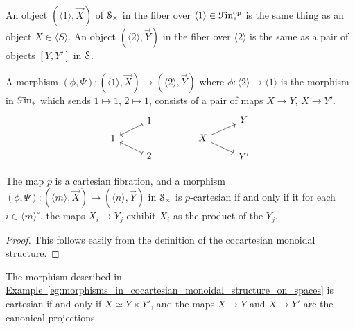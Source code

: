 \documentclass[main.tex]{subfiles}
\begin{document}
\begin{example}
  \label{eg:morphisms_in_cocartesian_monoidal_structure_on_spaces}
  An object $(\langle 1 \rangle, \vec{X})$ of $\S_{\times}$ in the fiber over $\langle 1 \rangle \in \Finp\op$ is the same thing as an object $X \in \langle S \rangle$. An object $( \langle 2 \rangle, \vec{Y})$ in the fiber over $\langle 2 \rangle$ is the same as a pair of objects $[Y, Y']$ in $\S$.

  A morphism $(\phi, \Psi)\colon (\langle 1 \rangle, \vec{X}) \to (\langle 2 \rangle, \vec{Y})$ where $\phi\colon \langle 2 \rangle \to \langle 1 \rangle$ is the morphism in $\Finp$ which sends $1 \mapsto 1$, $2 \mapsto 1$, consists of a pair of maps $X \to Y$, $X \to Y'$.
  \begin{equation*}
    \begin{tikzcd}[row sep=tiny]
      & 1
      \arrow[dl, mapsto]
      \\
      1
      \\
      & 2
      \arrow[ul, mapsto]
    \end{tikzcd}
    \qquad\qquad
    \begin{tikzcd}[row sep=tiny]
      & Y
      \\
      X
      \arrow[ur]
      \arrow[dr]
      \\
      & Y'
    \end{tikzcd}
  \end{equation*}
\end{example}

\begin{lemma}
  The map $p$ is a cartesian fibration, and a morphism $(\phi, \Psi)\colon (\langle m \rangle, \vec{X}) \to (\langle n \rangle, \vec{Y})$ in $\S_{\times}$ is $p$-cartesian if and only if it for each $i \in \langle m \rangle^{\circ}$, the maps $X_{i} \to Y_{j}$ exhibit $X_{i}$ as the product of the $Y_{j}$.
\end{lemma}
\begin{proof}
  This follows easily from the definition of the cocartesian monoidal structure.
\end{proof}

\begin{example}
  The morphism described in \hyperref[eg:morphisms_in_cocartesian_monoidal_structure_on_spaces]{Example~\ref*{eg:morphisms_in_cocartesian_monoidal_structure_on_spaces}} is cartesian if and only if $X \simeq Y \times Y'$, and the maps $X \to Y$ and $X \to Y'$ are the canonical projections.
\end{example}
\end{document}
